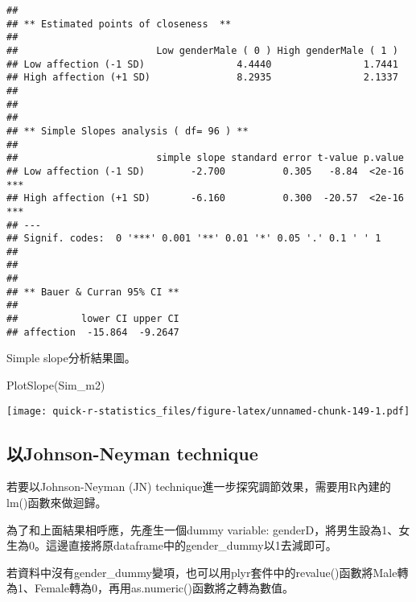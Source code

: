 \documentclass[
]{book}
\newenvironment{Shaded}{\begin{snugshade}}{\end{snugshade}}
\newcommand{\DecValTok}[1]{\textcolor[rgb]{0.00,0.00,0.81}{#1}}
\newcommand{\FunctionTok}[1]{\textcolor[rgb]{0.00,0.00,0.00}{#1}}
\newcommand{\NormalTok}[1]{#1}
\newcommand{\OtherTok}[1]{\textcolor[rgb]{0.56,0.35,0.01}{#1}}
\newcommand{\SpecialCharTok}[1]{\textcolor[rgb]{0.00,0.00,0.00}{#1}}
\begin{document}
\begin{verbatim}
## 
## ** Estimated points of closeness  **
## 
##                        Low genderMale ( 0 ) High genderMale ( 1 )
## Low affection (-1 SD)                4.4440                1.7441
## High affection (+1 SD)               8.2935                2.1337
## 
## 
## 
## ** Simple Slopes analysis ( df= 96 ) **
## 
##                        simple slope standard error t-value p.value    
## Low affection (-1 SD)        -2.700          0.305   -8.84  <2e-16 ***
## High affection (+1 SD)       -6.160          0.300  -20.57  <2e-16 ***
## ---
## Signif. codes:  0 '***' 0.001 '**' 0.01 '*' 0.05 '.' 0.1 ' ' 1
## 
## 
## 
## ** Bauer & Curran 95% CI **
## 
##           lower CI upper CI
## affection  -15.864  -9.2647
\end{verbatim}

Simple slope分析結果圖。

\begin{Shaded}
\begin{Highlighting}[]
\FunctionTok{PlotSlope}\NormalTok{(Sim\_m2)}
\end{Highlighting}
\end{Shaded}

\texttt{[image: quick-r-statistics\_files/figure-latex/unnamed-chunk-149-1.pdf]}

\hypertarget{ux4ee5johnson-neyman-technique}{%
\subsection{以Johnson-Neyman technique}\label{ux4ee5johnson-neyman-technique}}

若要以Johnson-Neyman (JN) technique進一步探究調節效果，需要用R內建的lm()函數來做迴歸。

為了和上面結果相呼應，先產生一個dummy variable: genderD，將男生設為1、女生為0。這邊直接將原dataframe中的gender\_dummy以1去減即可。

\begin{Shaded}
\end{Shaded}

若資料中沒有gender\_dummy變項，也可以用plyr套件中的revalue()函數將Male轉為1、Female轉為0，再用as.numeric()函數將之轉為數值。
\end{document}
